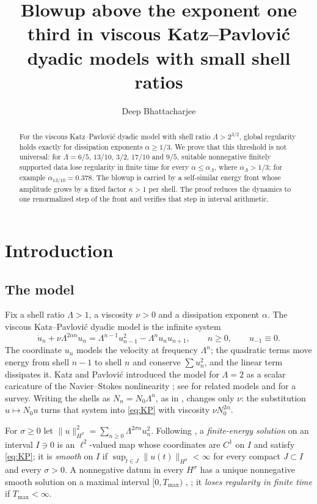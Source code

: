 \documentclass[12pt,reqno]{amsart}
\title[Blowup above one third in dyadic models]
{Blowup above the exponent one third in viscous Katz--Pavlovi\'c dyadic models with small shell ratios}
\author{Deep Bhattacharjee}
\date{}
\numberwithin{equation}{section}
\theoremstyle{plain}
\theoremstyle{definition}
\theoremstyle{remark}
\begin{document}
\begin{abstract}
For the viscous Katz--Pavlovi\'c dyadic model with shell ratio
$\Lambda>2^{3/2}$, global regularity holds exactly for dissipation
exponents $\alpha\ge1/3$. We prove that this threshold is not universal:
for $\Lambda=6/5$, $13/10$, $3/2$, $17/10$ and $9/5$, suitable
nonnegative finitely supported data lose regularity in finite time for
every $\alpha\le\alpha_\Lambda$, where $\alpha_\Lambda>1/3$; for example
$\alpha_{13/10}=0.378$. The blowup is carried by a self-similar energy
front whose amplitude grows by a fixed factor $\kappa>1$ per shell. The
proof reduces the dynamics to one renormalized step of the front and
verifies that step in interval arithmetic.
\end{abstract}

\maketitle

\section{Introduction}\label{sec:intro}

\subsection{The model}
Fix a shell ratio $\Lambda>1$, a viscosity $\nu>0$ and a dissipation
exponent $\alpha$. The viscous Katz--Pavlovi\'c dyadic model is the
infinite system
\begin{equation}\label{eq:KP}
  \dot u_n+\nu\Lambda^{2\alpha n}u_n=\Lambda^{n-1}u_{n-1}^2-\Lambda^n u_nu_{n+1},
  \qquad n\ge0,\qquad u_{-1}\equiv0 .
\end{equation}
The coordinate $u_n$ models the velocity at frequency $\Lambda^n$; the
quadratic terms move energy from shell $n-1$ to shell $n$ and conserve
$\sum u_n^2$, and the linear term dissipates it. Katz and Pavlovi\'c
introduced the model for $\Lambda=2$ as a scalar caricature of the
Navier--Stokes nonlinearity \cite{KP05}; see \cite{FP04,Wal06,KZ05,CFP07,BFM11,Jeo19}
for related models and \cite{CDF23} for a survey. Writing the shells as
$N_n=N_0\Lambda^n$, as in \cite{Zha26}, changes only $\nu$: the substitution
$u\mapsto N_0u$ turns that system into \eqref{eq:KP} with viscosity
$\nu N_0^{2\alpha}$.

For $\sigma\ge0$ let $\|u\|_{H^\sigma}^2=\sum_{n\ge0}\Lambda^{2\sigma n}u_n^2$.
Following \cite{Che08,Zha26}, a \emph{finite-energy solution} on an interval
$I\ni0$ is an $\ell^2$-valued map whose coordinates are $C^1$ on $I$ and
satisfy \eqref{eq:KP}; it is \emph{smooth} on $I$ if
$\sup_{t\in J}\|u(t)\|_{H^\sigma}<\infty$ for every compact $J\subset I$
and every $\sigma>0$. A nonnegative datum in every $H^\sigma$ has a unique
nonnegative smooth solution on a maximal interval $[0,T_{\max})$
\cite[Remark~3.4]{BMR11}, \cite[Proposition~2.4]{Zha26}; it \emph{loses
regularity in finite time} if $T_{\max}<\infty$.
\end{document}
